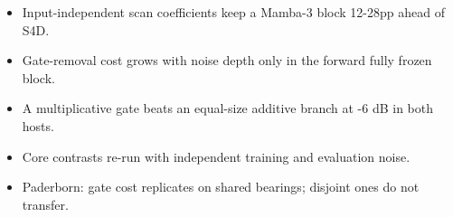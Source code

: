 \begin{itemize}
\item Input-independent scan coefficients keep a Mamba-3 block 12-28pp ahead of S4D.
\item Gate-removal cost grows with noise depth only in the forward fully frozen block.
\item A multiplicative gate beats an equal-size additive branch at -6 dB in both hosts.
\item Core contrasts re-run with independent training and evaluation noise.
\item Paderborn: gate cost replicates on shared bearings; disjoint ones do not transfer.
\end{itemize}
